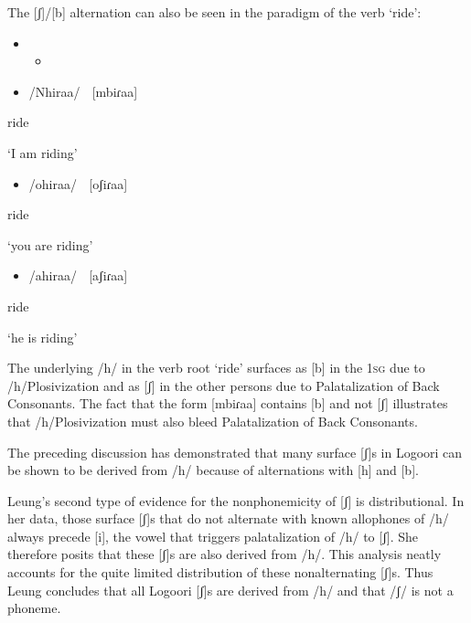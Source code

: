 The [ʃ]/[b] alternation can also be seen in the paradigm of the verb ‘ride’:

\begin{itemize}
\item \setcounter{itemize}{0}
\begin{itemize}
\item \end{itemize}
\end{itemize}
\setcounter{itemize}{0}
\begin{itemize}
\item /Nhiraa/    [mbiɾaa]

\end{itemize}

ride

‘I am riding’

\begin{itemize}
\item /ohiraa/    \textsc{[}oʃiɾaa]

\end{itemize}

ride\textsc{ }

‘you are riding’  

\begin{itemize}
\item /ahiraa/    [aʃiɾaa]  

\end{itemize}

ride

‘he is riding’

The underlying /h/ in the verb root ‘ride’ surfaces as [b] in the 1\textsc{sg} due to /h/Plosivization and as [ʃ] in the other persons due to Palatalization of Back Consonants. The fact that the form [mbiɾaa] contains [b] and not [ʃ] illustrates that /h/Plosivization must also bleed Palatalization of Back Consonants. 

The preceding discussion has demonstrated that many surface [ʃ]s in Logoori can be shown to be derived from /h/ because of alternations with [h] and [b]. 

Leung’s second type of evidence for the nonphonemicity of [ʃ] is distributional. In her data, those surface [ʃ]s that do not alternate with known allophones of /h/ always precede [i], the vowel that triggers palatalization of /h/ to [ʃ]. She therefore posits that these [ʃ]s are also derived from /h/. This analysis neatly accounts for the quite limited distribution of these nonalternating [ʃ]s. Thus Leung concludes that all Logoori [ʃ]s are derived from /h/ and that /ʃ/ is not a phoneme.

